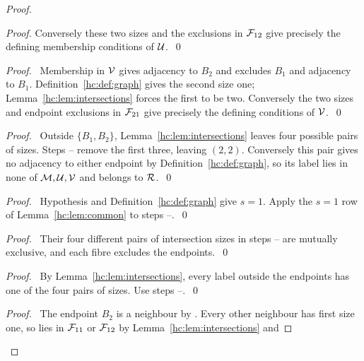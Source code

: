 \begin{mergedproofsection}
\begin{proof}
\begin{proof}
  Conversely these two sizes and the exclusions in ${\mathcal F}_{12}$ give
  precisely the defining membership conditions of ${\mathcal U}$.~\qed\end{proof}
 \begin{proof}\pf\ Membership in ${\mathcal V}$ gives adjacency to $B_2$
  and excludes $B_1$ and adjacency to $B_1$.
  Definition~\ref{hc:def:graph} gives the second size one;
  Lemma~\ref{hc:lem:intersections} forces the first to be two.
  Conversely the two sizes and endpoint exclusions in ${\mathcal F}_{21}$
  give precisely the defining conditions of ${\mathcal V}$.~\qed\end{proof}
 \begin{proof}\pf\ Outside $\{B_1,B_2\}$,
  Lemma~\ref{hc:lem:intersections} leaves four possible pairs of
  sizes. Steps --
  remove the first three, leaving $(2,2)$. Conversely this pair
  gives no adjacency to either endpoint by Definition~\ref{hc:def:graph},
  so its label lies in none of ${\mathcal M},{\mathcal U},{\mathcal V}$ and belongs to ${\mathcal R}$.~\qed\end{proof}
 \begin{proof}\pf\ Hypothesis  and
  Definition~\ref{hc:def:graph} give $s=1$.
  Apply the $s=1$ row of Lemma~\ref{hc:lem:common} to
  steps --.~\qed\end{proof}
 \begin{proof}\pf\ Their four different pairs of intersection
  sizes in steps --
  are mutually exclusive, and each fibre excludes the endpoints.~\qed\end{proof}
 \begin{proof}\pf\ By Lemma~\ref{hc:lem:intersections}, every label
  outside the endpoints has one of the four pairs of sizes.
  Use steps --.~\qed\end{proof}
 \begin{proof}\pf\ The endpoint $B_2$ is a neighbour by .
  Every other neighbour has first size one, so lies in ${\mathcal F}_{11}$
  or ${\mathcal F}_{12}$ by Lemma~\ref{hc:lem:intersections} and

\end{proof}
\end{proof}
\end{mergedproofsection}

